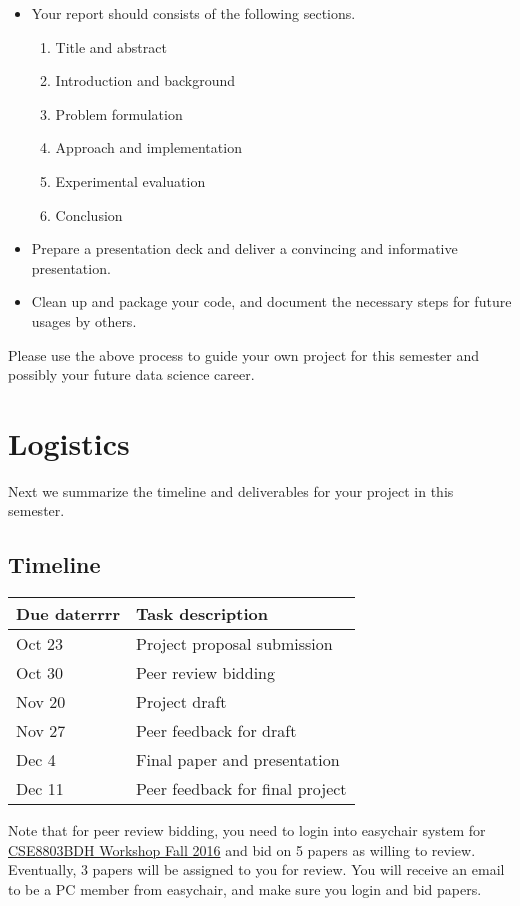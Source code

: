 \documentclass[journal]{IEEEtran}
\begin{document}
\begin{itemize}
\item Your report should consists of the following sections.
\begin{enumerate}
\item Title and abstract
\item Introduction and background
\item Problem formulation
\item Approach and implementation
\item Experimental evaluation
\item Conclusion
\end{enumerate}
\item Prepare a presentation deck and deliver a convincing and informative presentation.
\item Clean up and package your code, and document the necessary steps for future usages by others.
\end{itemize}

Please use the above process to guide your own project for this semester and possibly your future data science career.

\section{Logistics}
Next we summarize the timeline and deliverables for your project in this semester. 

\subsection{Timeline}
\begin{center}
\begin{tabular}{ l |  l }
\hline
Due daterrrr & Task description \\
  \hline
  Oct 23 & Project proposal submission   \\
  Oct 30 & Peer review bidding\\
  Nov 20 & Project draft\\
  Nov 27 & Peer feedback for draft\\
  Dec 4  & Final paper and presentation\\
  Dec 11 & Peer feedback for final project\\
  \hline
\end{tabular}
\end{center}
Note that for peer review bidding, you need to login into easychair system for \href{https://easychair.org/conferences/?conf=cse8803bdhfall2016}{CSE8803BDH Workshop Fall 2016} and bid on 5 papers as willing to review. Eventually, 3 papers will be assigned to you for review. You will receive an email to be a PC member from easychair, and make sure you login and bid papers. 
\end{document}
